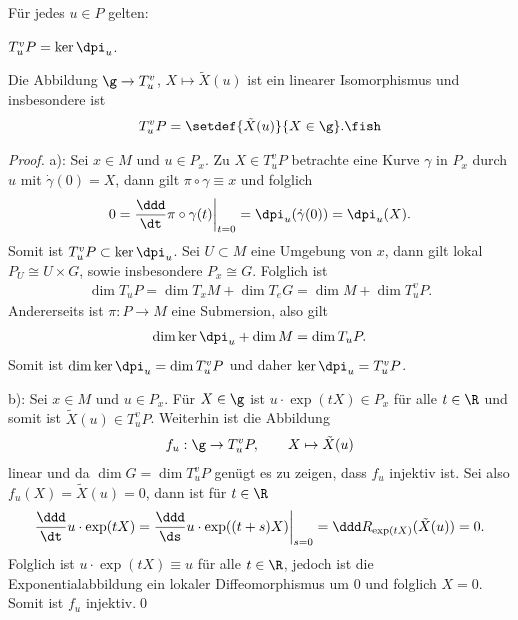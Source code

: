 \documentclass[%
	paper=a5,%
	fleqn,%
	DIV=18,%
	BCOR=0mm,
	fontsize=11pt,
	titlepage=false,%
	bibliography=totoc,
	DIV=18,%
	twoside=true,
	pdftitle=Riemannsche Geometrie,
	pdfauthor=Uwe Semmelmann,
	numbers=noendperiod]%
	{scrbook}
\begin{document}
\begin{prop}
Für jedes $u\in P$ gelten:
\begin{propenum}
\item $T^v_uP = \ker\dpi_u$.
\item Die Abbildung $\g\to T^v_u$, $X\mapsto \tilde{X}(u)$
ist ein linearer Isomorphismus und insbesondere ist
\begin{align*}
T^v_uP = \setdef{\tilde{X}(u)}{X\in \g}.\fish
\end{align*}
\end{propenum}
\end{prop}
\begin{proof}
a): Sei $x\in M$ und $u\in P_x$. Zu $X\in T^v_uP$ betrachte eine Kurve
$\gamma$ in $P_x$ durch $u$ mit $\dot{\gamma}(0) = X$, dann gilt
$\pi\circ\gamma \equiv x$ und folglich
\begin{align*}
0 = \frac{\ddd}{\dt}\pi\circ\gamma(t) \bigg|_{t=0}
= \dpi_u(\dot{\gamma}(0)) = \dpi_u(X).
\end{align*}
Somit ist $T^v_uP \subset \ker \dpi_u$. Sei $U\subset M$ eine Umgebung von
$x$, dann gilt lokal $P_U \cong U\times G$, sowie insbesondere $P_x\cong G$.
Folglich ist 
\begin{align*}
\dim T_uP = \dim T_x M + \dim T_e G = \dim M + \dim T^v_uP.
\end{align*}
Andererseits ist $\pi: P\to M$ eine Submersion, also gilt 
\begin{align*}
\dim \ker \dpi_u + \dim M = \dim T_uP.
\end{align*}
Somit ist $\dim \ker \dpi_u = \dim T^v_uP$ und daher $\ker\dpi_u = T^v_uP$.

b): Sei $x\in M$ und $u\in P_x$. Für $X\in\g$ ist $u\cdot \exp(tX) \in P_x$ für
alle $t\in\R$ und somit ist $\tilde{X}(u) \in T^v_uP$. Weiterhin ist die
Abbildung
\begin{align*}
f_u : \g\to T^v_uP,\qquad X\mapsto \tilde{X}(u) 
\end{align*}
linear und da $\dim G = \dim T^v_uP$ genügt es zu zeigen, dass $f_u$
injektiv ist. Sei also $f_u(X) = \tilde{X}(u) = 0$, dann ist für $t\in\R$
\begin{align*}
\frac{\ddd}{\dt} u\cdot \exp(tX)
=
\frac{\ddd}{\ds} u\cdot \exp((t+s)X)\bigg|_{s=0}
=
\ddd R_{\exp(tX)}(\tilde{X}(u)) = 0.
\end{align*}
Folglich ist $u\cdot \exp(tX) \equiv u$ für alle $t\in\R$, jedoch ist die
Exponentialabbildung ein lokaler Diffeomorphismus um $0$ und folglich $X=0$.
Somit ist $f_u$ injektiv.\qed
\end{proof}
\end{document}
